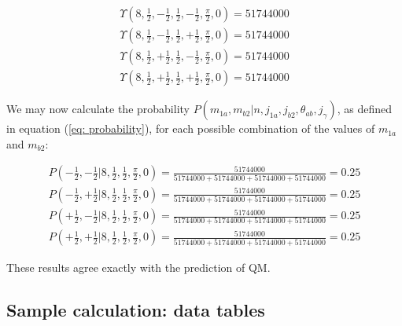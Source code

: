 \documentclass{article}
\begin{document}
\begin{equation}
\begin{array}{ll}
    \Upsilon(8,\frac{1}{2},-\frac{1}{2},\frac{1}{2},-\frac{1}{2},\frac{\pi}{2},0)=51744000\\
    \Upsilon(8,\frac{1}{2},-\frac{1}{2},\frac{1}{2},+\frac{1}{2},\frac{\pi}{2},0)=51744000\\
    \Upsilon(8,\frac{1}{2},+\frac{1}{2},\frac{1}{2},-\frac{1}{2},\frac{\pi}{2},0)=51744000\\
    \Upsilon(8,\frac{1}{2},+\frac{1}{2},\frac{1}{2},+\frac{1}{2},\frac{\pi}{2},0)=51744000
  
\end{array}
\end{equation}

We may now calculate the probability $P(m_{1a},m_{b2}|n,j_{1a},j_{b2},\theta_{ab},j_{\gamma})$, as defined in equation (\ref{eq: probability}), for each possible combination of the values of $m_{1a}$ and $m_{b2}$:

\begin{equation}
\begin{array}{cc}
    P(-\frac{1}{2},-\frac{1}{2}|8,\frac{1}{2},\frac{1}{2},\frac{\pi}{2},0)=\frac{51744000}{51744000+51744000+51744000+51744000}=0.25\\
    P(-\frac{1}{2},+\frac{1}{2}|8,\frac{1}{2},\frac{1}{2},\frac{\pi}{2},0)=\frac{51744000}{51744000+51744000+51744000+51744000}=0.25\\
    P(+\frac{1}{2},-\frac{1}{2}|8,\frac{1}{2},\frac{1}{2},\frac{\pi}{2},0)=\frac{51744000}{51744000+51744000+51744000+51744000}=0.25\\
    P(+\frac{1}{2},+\frac{1}{2}|8,\frac{1}{2},\frac{1}{2},\frac{\pi}{2},0)=\frac{51744000}{51744000+51744000+51744000+51744000}=0.25
\end{array}
\end{equation}

These results agree exactly with the prediction of QM. 

\subsection{Sample calculation: data tables \label{sec: data tables}}
\end{document}

